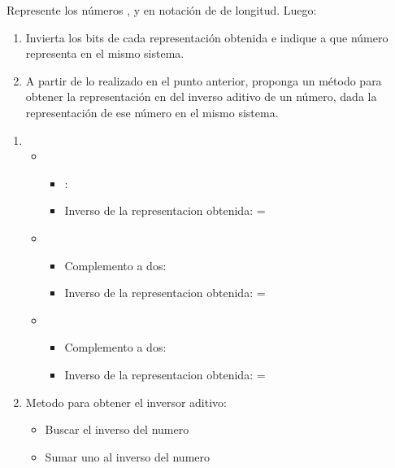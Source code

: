 \begin{enunciado}{\ejercicio}
  Represente los números ,  y  en notación \compDos de  de
  longitud. Luego:

  \begin{enumerate}[label=\alph*)]
    \item Invierta los bits de cada representación obtenida e indique a que número representa en
          el mismo sistema.
    \item A partir de lo realizado en el punto anterior, proponga un método para obtener la representación en
          \compDos del inverso aditivo de un número, dada la representación de ese número en el mismo
          sistema.
  \end{enumerate}
\end{enunciado}

\begin{enumerate}[label=(\alph*)]
  \item \begin{itemize}
          \item {}
                \begin{itemize}
                  \item \compDos:  
                  \item Inverso de la representacion obtenida:  = 
                \end{itemize}
          \item {}
                \begin{itemize}
                  \item Complemento a dos: 
                  \item Inverso de la representacion obtenida:  =  
                \end{itemize}
          \item {}
                \begin{itemize}
                  \item Complemento a dos: 
                  \item Inverso de la representacion obtenida:  =  
                \end{itemize}
        \end{itemize}
  \item Metodo para obtener el inversor aditivo:
        \begin{itemize}
          \item Buscar el inverso del numero
          \item Sumar uno al inverso del numero
        \end{itemize}
\end{enumerate}

\begin{aportes}
  \item {}
\end{aportes}
